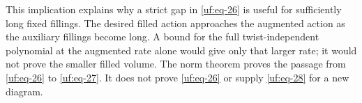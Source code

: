 This implication explains why a strict gap in \eqref{uf:eq-26} is useful for
sufficiently long fixed fillings. The desired filled action approaches
the augmented action as the auxiliary fillings become long. A bound for
the full twist-independent polynomial at the augmented rate alone would
give only that larger rate; it would not prove the smaller filled
volume. The norm theorem proves the passage from \eqref{uf:eq-26} to \eqref{uf:eq-27}. It does
not prove \eqref{uf:eq-26} or supply \eqref{uf:eq-28} for a new diagram.
